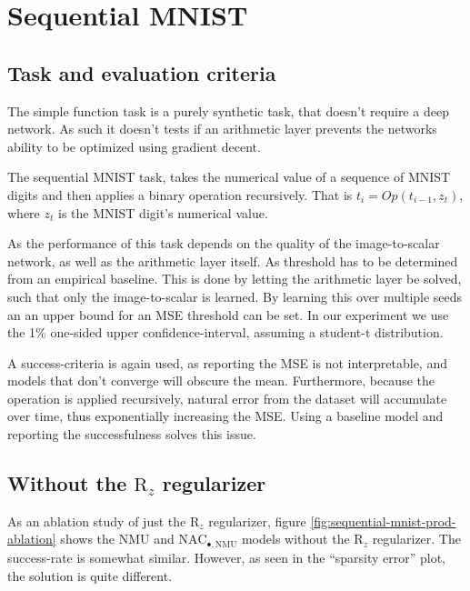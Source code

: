 \section{Sequential MNIST}

\subsection{Task and evaluation criteria}
The simple function task is a purely synthetic task, that doesn't require a deep network. As such it doesn't tests if an arithmetic layer prevents the networks ability to be optimized using gradient decent.

The sequential MNIST task, takes the numerical value of a sequence of MNIST digits and then applies a binary operation recursively. That is $t_i = Op(t_{i-1}, z_t)$, where $z_t$ is the MNIST digit's numerical value.

As the performance of this task depends on the quality of the image-to-scalar network, as well as the arithmetic layer itself. As threshold has to be determined from an empirical baseline. This is done by letting the arithmetic layer be solved, such that only the image-to-scalar is learned. By learning this over multiple seeds an an upper bound for an MSE threshold can be set. In our experiment we use the 1\% one-sided upper confidence-interval, assuming a student-t distribution.

A success-criteria is again used, as reporting the MSE is not interpretable, and models that don't converge will obscure the mean. Furthermore, because the operation is applied recursively, natural error from the dataset will accumulate over time, thus exponentially increasing the MSE. Using a baseline model and reporting the successfulness solves this issue.

\subsection{Without the \texorpdfstring{$\mathrm{R}_z$}{R\_z} regularizer}
\label{sec:appendix:sequential-mnist:ablation}

As an ablation study of just the $\mathrm{R}_z$ regularizer, figure \ref{fig:sequential-mnist-prod-ablation} shows the NMU and $\mathrm{NAC}_{\bullet,\mathrm{NMU}}$ models without the $\mathrm{R}_z$ regularizer. The success-rate is somewhat similar. However, as seen in the ``sparsity error'' plot, the solution is quite different.

